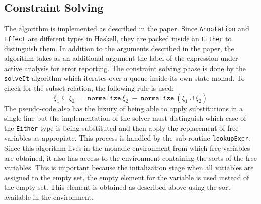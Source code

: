 \documentclass[8pt]{extarticle}
\begin{document}
\subsection{Constraint Solving}
The algorithm is implemented as described in the paper. Since \verb+Annotation+ and \verb+Effect+ are different types in Haskell, they are packed inside an \verb+Either+ to distinguish them. In addition to the arguments described in the paper, the algorithm takes as an additional argument the label of the expression under active analysis for error reporting. The constraint solving phase is done by the \verb+solveIt+ algorithm which iterates over a queue inside its own state monad. To check for the subset relation, the following rule is used:
\[
\xi_1\subseteq \xi_2\ =\ \mathtt{normalize}\ \xi_2\ \equiv\ \mathtt{normalize}\ \left(\xi_1\cup\xi_2\right)
\]
The pseudo-code also has the luxury of being able to apply substitutions in a single line but the implementation of the solver must distinguish which case of the \verb+Either+ type is being substituted and then apply the replacement of free variables as appropiate. This process is handled by the sub-routine \verb+lookupExpr+. Since this algorithm lives in the monadic environment from which free variables are obtained, it also has access to the environment containing the sorts of the free variables. This is important because the initalization stage when all variables are assigned to the empty set, the empty element for the variable is used instead of the empty set. This element is obtained as described above using the sort available in the environment.
\end{document}
